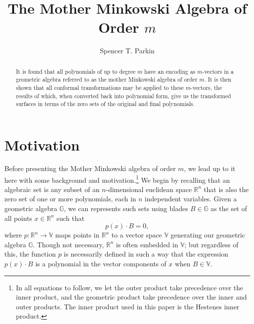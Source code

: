 \documentclass{ecgd-l}
\theoremstyle{definition}
\theoremstyle{remark}
\numberwithin{equation}{section}
\newcommand{\R}{\mathbb{R}}
\newcommand{\G}{\mathbb{G}}
\newcommand{\V}{\mathbb{V}}
\begin{document}
\title{The Mother Minkowski Algebra of Order $m$}

\author{Spencer T. Parkin}
\address{102 W. 500 S., Salt Lake City, UT  84101}



\begin{abstract}
It is found that all polynomials of up to degree $m$
have an encoding as $m$-vectors in a geometric algebra referred
to as the mother Minkowski algebra of order $m$.
It is then shown that all conformal transformations may be
applied to these $m$-vectors, the results of which, when converted
back into polynomial form, give us the transformed surfaces in terms
of the zero sets of the original and final polynomials.
\end{abstract}

\maketitle

\section{Motivation}

Before presenting the Mother Minkowski algebra of order $m$, we lead up to it here with
some background and motivation.\footnote{In all equations to follow, we let the
outer product take precedence over the inner product, and the geometric product
take precedence over the inner and outer products.  The inner product used in this
paper is the Hestenes inner product.}
We begin by recalling that an algebraic set is any 
subset of an $n$-dimensional euclidean space $\R^n$ that is also the zero set of one
or more polynomials, each in $n$ independent variables.  Given a geometric algebra $\G$, we can represents such sets
using blades $B\in\G$ as the set of all points $x\in\R^n$ such that
\begin{equation*}
p(x)\cdot B=0,
\end{equation*}
where $p:\R^n\to\V$ maps points in $\R^n$ to a vector space $\V$ generating
our geometric algebra $\G$.  Though not necessary, $\R^n$ is often embedded in $\V$;
but regardless of this, the function $p$ is necessarily defined in such a way that the expression
$p(x)\cdot B$ is a polynomial in the vector components of $x$ when $B\in\V$.
\end{document}
